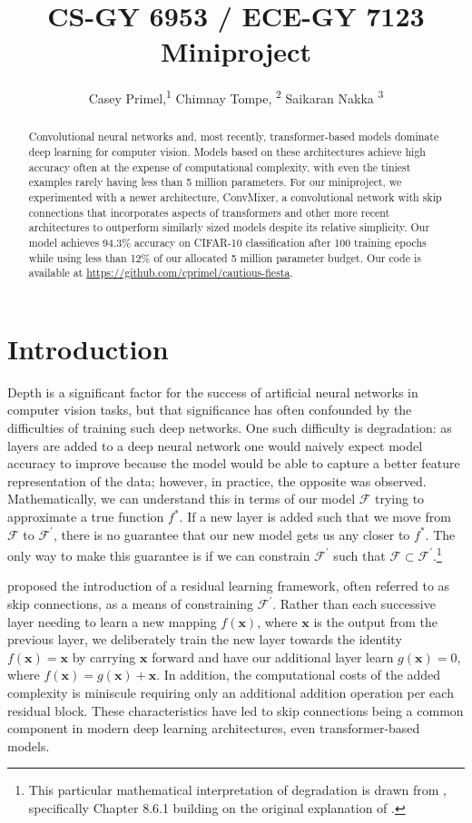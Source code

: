 \documentclass[letterpaper]{article} %
\title{CS-GY 6953 / ECE-GY 7123 Miniproject}
\author {
    Casey Primel,\textsuperscript{\rm 1}
    Chimnay Tompe, \textsuperscript{\rm 2}
    Saikaran Nakka \textsuperscript{\rm 3}
}
\begin{document}
\maketitle

\begin{abstract}
Convolutional neural networks and, most recently, transformer-based models dominate deep learning for computer vision. Models based on these architectures achieve high accuracy often at the expense of computational complexity, with even the tiniest examples rarely having less than 5 million parameters. For our miniproject, we experimented with a newer architecture, ConvMixer, a convolutional network with skip connections that incorporates aspects of transformers and other more recent architectures to outperform similarly sized models despite its relative simplicity. Our model achieves 94.3\% accuracy on CIFAR-10 classification after 100 training epochs while using less than 12\% of our allocated 5 million parameter budget. Our code is available at \url{https://github.com/cprimel/cautious-fiesta}.
\end{abstract}

\section{Introduction}

Depth is a significant factor for the success of artificial neural networks in computer vision tasks, but that significance has often confounded by the difficulties of training such deep networks. One such difficulty is degradation: as layers are added to a deep neural network one would naively expect model accuracy to improve because the model would be able to capture a better feature representation of the data; however, in practice, the opposite was observed. Mathematically, we can understand this in terms of our model $\mathcal{F}$ trying to approximate a true function $f^*$. If a new layer is added such that we move from $\mathcal{F}$ to $\mathcal{F}^\prime$, there is no guarantee that our new model gets us any closer to $f^*$. The only way to make this guarantee is if we can constrain $\mathcal{F}^\prime$ such that $\mathcal{F} \subset \mathcal{F}^\prime$.\footnote{This particular mathematical interpretation of degradation is drawn from \citet{Zhang2021}, specifically Chapter 8.6.1 building on the original explanation of \citet{He2015}.}

\citet{He2015} proposed the introduction of a residual learning framework, often referred to as skip connections, as a means of constraining $\mathcal{F}^\prime$. Rather than each successive layer needing to learn a new mapping $f(\mathbf{x})$, where $\mathbf{x}$ is the output from the previous layer, we deliberately train the new layer towards the identity $f(\mathbf{x})=\mathbf{x}$ by carrying $\mathbf{x}$ forward and have our additional layer learn $g(\mathbf{x}) = 0$, where $f(\mathbf{x})= g(\mathbf{x}) + \mathbf{x}$. In addition, the computational costs of the added complexity is miniscule requiring only an additional addition operation per each residual block. These characteristics have led to skip connections being a common component in modern deep learning architectures, even transformer-based models. 
\end{document}

